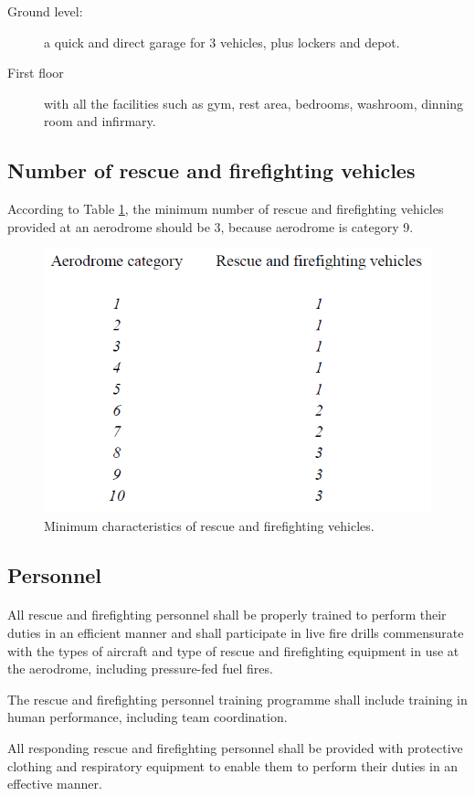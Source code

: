		\begin{description}
			\item[Ground level:] a quick and direct garage for 3 vehicles, plus lockers and depot.
			\item[First floor] with all the facilities such as gym, rest area, bedrooms, washroom, dinning room and infirmary.
		\end{description}
			
	\subsection{Number of rescue and firefighting vehicles}
	According to Table \ref{table9241}, the minimum number of rescue and firefighting vehicles provided at an aerodrome should be 3, because aerodrome is category 9.
	\begin{figure}[H]
		\centering
		\includegraphics[clip, trim=0cm 0cm 0cm 0cm, width=.6\textwidth]{./images/firefighting/table9241}
		\caption{Minimum characteristics of rescue and firefighting vehicles.}
		\label{table9241}
	\end{figure}
	\subsection{Personnel}
	\paragraph{} All rescue and firefighting personnel shall be properly trained to perform their duties in an efficient manner and shall participate in live fire drills commensurate with the types of aircraft and type of rescue and firefighting equipment in use at the aerodrome, including pressure-fed fuel fires.
	
	The rescue and firefighting personnel training programme shall include training in human performance, including team coordination.
	
	All responding rescue and firefighting personnel shall be provided with protective clothing and respiratory equipment to enable them to perform their duties in an effective manner.
	
